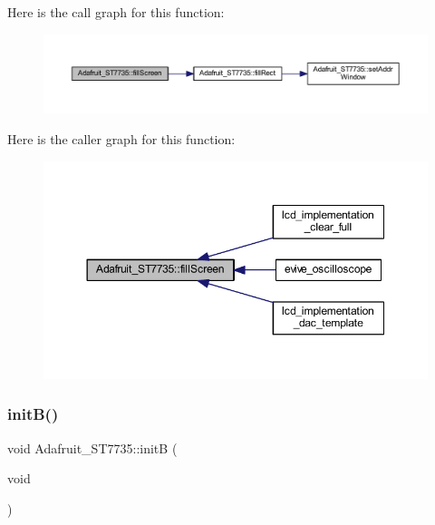 Here is the call graph for this function\+:\nopagebreak
\begin{figure}[H]
\begin{center}
\leavevmode
\includegraphics[width=350pt]{class_adafruit___s_t7735_af732d3d78239687718bb117de99418ca_cgraph}
\end{center}
\end{figure}
Here is the caller graph for this function\+:\nopagebreak
\begin{figure}[H]
\begin{center}
\leavevmode
\includegraphics[width=350pt]{class_adafruit___s_t7735_af732d3d78239687718bb117de99418ca_icgraph}
\end{center}
\end{figure}
\mbox{\label{class_adafruit___s_t7735_a71d8744ce7a27cd978ec64616d2ddae4}} 
\subsubsection{\texorpdfstring{init\+B()}{initB()}}
{\footnotesize\ttfamily void Adafruit\+\_\+\+S\+T7735\+::initB (\begin{DoxyParamCaption}\item[{void}]{ }\end{DoxyParamCaption})}

\mbox{\label{class_adafruit___s_t7735_a416b7a2b4748a90f8a33028522fa7504}} 
